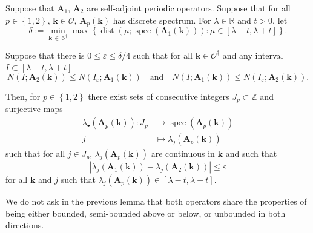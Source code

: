 \documentclass[AHL,Unicode,longabstracts,published]{cedram}
\DeclareMathOperator{\spec}{spec}
\DeclareMathOperator{\dist}{dist}
\newcommand{\R}{\mathbb R}
\newcommand{\Z}{\mathbb Z}
\newcommand{\CO}{\mathcal{O}}
\newcommand{\BA}{\mathbf A}
\newcommand{\bk}{\mathbf k}
\newcommand{\eps}{\varepsilon}
\newcommand{\set}[1]{\left\{ #1 \right\}}
\begin{document}
\begin{lemm} \label{lem:overlapidscont}
Suppose that $\BA_1$, $\BA_2$ are self-adjoint periodic operators. Suppose that for all $p \in \set{1,2}$, $\bk \in \CO$, $\BA_p(\bk)$ has discrete spectrum. For $\lambda \in \R$ and $t > 0$, let
\begin{equation}\label{eq:smalldist}
\delta := \min_{\bk\,\in\,\CO^\dagger} \max\left\{\dist(\mu;\spec(\BA_1(\bk))) :
\mu \in [\lambda - t, \lambda + t]\right\}.
\end{equation}

Suppose that there is $0 \le \eps \le \delta/4$ such that for all $\bk \in
\CO^\dagger$ and any interval $I \subset [\lambda - t, \lambda + t]$
\begin{equation}\label{eq:condids}
N(I; \BA_2(\bk)) \le N(I_\eps;\BA_1(\bk))
\quad \text{and} \quad N(I;\BA_1(\bk)) \le N(I_\eps;\BA_2(\bk)).
\end{equation}

Then, for $p \in \set{1,2}$ there exist sets of consecutive integers $J_p \subset \Z$ and surjective maps
\[
\begin{aligned}
\lambda_\bullet(\BA_p(\bk)) : J_p &\to \spec(\BA_p(\bk)) \\
j &\mapsto \lambda_j(\BA_p(\bk))
\end{aligned}
\]
such that for all $j \in J_p$, $\lambda_j(\BA_p(\bk))$ are continuous in $\bk$ and such that
\begin{equation}\label{eq:evclose}
\left|\lambda_j(\BA_1(\bk)) - \lambda_j(\BA_2(\bk))\right| \le \eps
\end{equation}
for all $\bk$ and $j$ such that $\lambda_j(\BA_p(\bk)) \in [\lambda-t,\lambda+t]$.
\end{lemm}

\begin{rema}
We do not ask in the previous lemma that both operators share the properties of being either bounded, semi-bounded above or below, or unbounded in both directions.
\end{rema}
\end{document}
